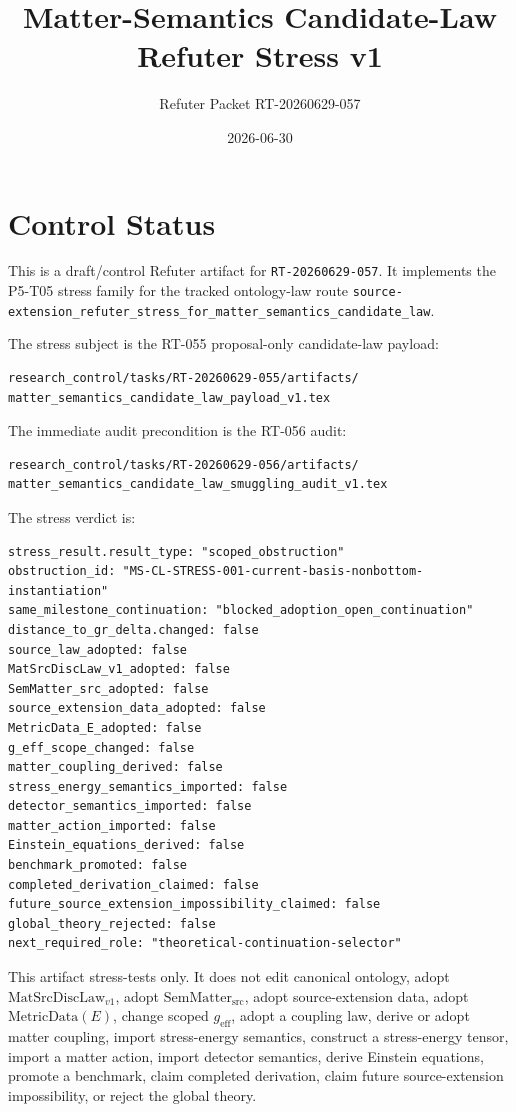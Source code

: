 \documentclass[11pt]{article}
\title{Matter-Semantics Candidate-Law Refuter Stress v1}
\author{Refuter Packet RT-20260629-057}
\date{2026-06-30}
\newcommand{\MetricData}{\mathrm{MetricData}}
\newcommand{\geff}{g_{\mathrm{eff}}}
\newcommand{\MatSrcDiscLaw}{\mathrm{MatSrcDiscLaw}_{v1}}
\newcommand{\SemMatterSrc}{\mathrm{SemMatter}_{\mathrm{src}}}
\begin{document}
\maketitle

\section{Control Status}

This is a draft/control Refuter artifact for \texttt{RT-20260629-057}. It
implements the P5-T05 stress family for the tracked ontology-law route
\texttt{source-extension\_refuter\_stress\_for\_matter\_semantics\_candidate\_law}.

The stress subject is the RT-055 proposal-only candidate-law payload:

\begin{verbatim}
research_control/tasks/RT-20260629-055/artifacts/
matter_semantics_candidate_law_payload_v1.tex
\end{verbatim}

The immediate audit precondition is the RT-056 audit:

\begin{verbatim}
research_control/tasks/RT-20260629-056/artifacts/
matter_semantics_candidate_law_smuggling_audit_v1.tex
\end{verbatim}

The stress verdict is:

\begin{verbatim}
stress_result.result_type: "scoped_obstruction"
obstruction_id: "MS-CL-STRESS-001-current-basis-nonbottom-instantiation"
same_milestone_continuation: "blocked_adoption_open_continuation"
distance_to_gr_delta.changed: false
source_law_adopted: false
MatSrcDiscLaw_v1_adopted: false
SemMatter_src_adopted: false
source_extension_data_adopted: false
MetricData_E_adopted: false
g_eff_scope_changed: false
matter_coupling_derived: false
stress_energy_semantics_imported: false
detector_semantics_imported: false
matter_action_imported: false
Einstein_equations_derived: false
benchmark_promoted: false
completed_derivation_claimed: false
future_source_extension_impossibility_claimed: false
global_theory_rejected: false
next_required_role: "theoretical-continuation-selector"
\end{verbatim}

This artifact stress-tests only. It does not edit canonical ontology, adopt
\(\MatSrcDiscLaw\), adopt \(\SemMatterSrc\), adopt source-extension data, adopt
\(\MetricData(E)\), change scoped \(\geff\), adopt a coupling law, derive or
adopt matter coupling, import stress-energy semantics, construct a
stress-energy tensor, import a matter action, import detector semantics,
derive Einstein equations, promote a benchmark, claim completed derivation,
claim future source-extension impossibility, or reject the global theory.
\end{document}
